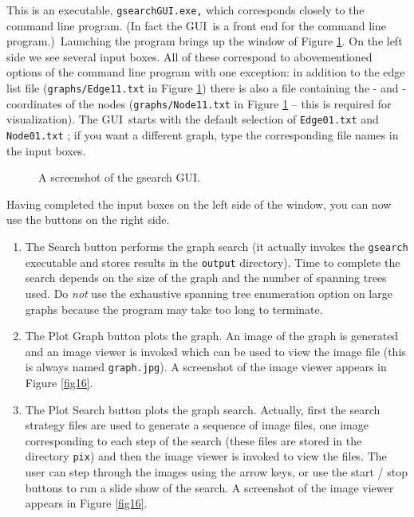 \documentclass[11pt]{article}\usepackage{amsmath}
\begin{document}
This is an executable, \texttt{gsearchGUI.exe,} which corresponds closely to
the command line program. (In fact the GUI\ is a front end for the command
line program.)\ Launching the program brings up the window of Figure
\ref{fig15}. On the left side we see several input boxes. All of these
correspond to abovementioned options of the command line program with one
exception: in addition to the edge list file (\texttt{graphs/Edge11.txt} in
Figure \ref{fig15}) there is also a file containing the - and
-coordinates of the nodes (\texttt{graphs/Node11.txt} in Figure \ref{fig15}
-- this is required for visualization). The GUI\ starts with the default
selection of \texttt{Edge01.txt} and \texttt{Node01.txt} ; if you want a
different graph, type the corresponding file names in the input boxes.

\begin{figure}[h]
\centering{}\caption{A
screenshot of the gsearch GUI.}\label{fig15}\end{figure}

Having completed the input boxes on the left side of the window, you can now
use the buttons on the right side.

\begin{enumerate}
\item The \textsf{Search} button performs the graph search (it actually
invokes the \texttt{gsearch} executable and stores results in the
\texttt{output} directory). Time to complete the search depends on the size of
the graph and the number of spanning trees used. Do \emph{not} use the
exhaustive spanning tree enumeration option on large graphs because the
program may take too long to terminate.

\item The \textsf{Plot Graph} button plots the graph. An image of the graph is
generated and an image viewer is invoked which can be used to view the image
file (this is always named \texttt{graph.jpg}). A screenshot of the image
viewer appears in Figure \ref{fig16}.

\item The \textsf{Plot Search} button plots the graph search. Actually, first
the search strategy files are used to generate a sequence of image files, one
image corresponding to each step of the search (these files are stored in the
directory \texttt{pix}) and then the image viewer is invoked to view the
files. The user can step through the images using the arrow keys, or use the
\textsf{start} / \textsf{stop }buttons to run a slide show of the search. A
screenshot of the image viewer appears in Figure \ref{fig16}.
\end{enumerate}
\end{document}
